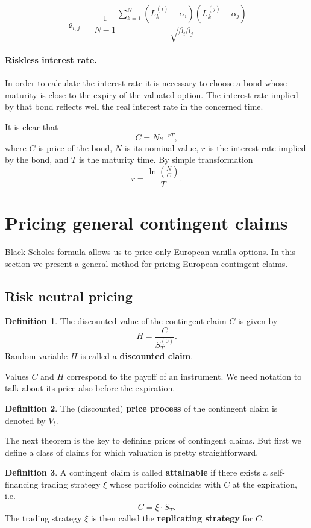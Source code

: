 \documentclass[a4paper,11pt, twoside]{book}
\theoremstyle{definition}
\newtheorem{mydef}{Definition}[chapter]
\theoremstyle{remark}
\def\Sa{\bar{S}}
\def\xia{\bar{\xi}}
\begin{document}
\[ \varrho_{i,j} = \frac{1}{N-1} \frac{\sum\limits_{k=1}^N(L^{(i)}_k - \alpha_i)(L^{(j)}_k - \alpha_j)}{\sqrt{\beta_i \beta_j}} \]

\paragraph{Riskless interest rate.}
In order to calculate the interest rate it is necessary to choose a bond whose maturity is close to the expiry of the valuated option. The interest rate implied by that bond reflects well the real interest rate in the concerned time.

It is clear that
\[ C = Ne^{-rT}, \]
where $C$ is price of the bond, $N$ is its nominal value, $r$ is the interest rate implied by the bond, and $T$ is the maturity time. By simple transformation
\begin{equation*}
r = \dfrac{\ln(\frac{N}{C})}{T}.
\end{equation*}

\section{Pricing general contingent claims}
\label{sec:risk-neutral}
Black-Scholes formula allows us to price only European vanilla options. In this section we present a general method for pricing European contingent claims. 

\subsection{Risk neutral pricing}
\begin{mydef}
 The discounted value of the contingent claim $C$ is given by
 \begin{equation*}
  H = \frac{C}{S^{(0)}_T}.
 \end{equation*}
 Random variable $H$ is called a \textbf{discounted claim}.
\end{mydef}

Values $C$ and $H$ correspond to the payoff of an instrument. We need notation to talk about its price also before the expiration.
\begin{mydef}
 The (discounted) \textbf{price process} of the contingent claim is denoted by $V_t$. 
\end{mydef}

The next theorem is the key to defining prices of contingent claims. But first we define a class of claims for which valuation is pretty straightforward. 
\begin{mydef}
 A contingent claim is called \textbf{attainable} if there exists a self-financing trading strategy $\xia$ whose portfolio coincides with $C$ at the expiration, i.e.
 \[ C = \xia \cdot \Sa_T. \]
 The trading strategy $\xia$ is then called the \textbf{replicating strategy} for $C$.
\end{mydef}
\end{document}
